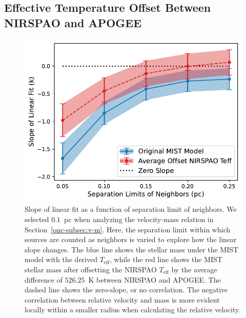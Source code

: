 \documentclass[12pt]{ucsddissertation}
\begin{document}
\begin{CJK*}{UTF8}{gbsn}
\subsection{Effective Temperature Offset Between NIRSPAO and APOGEE}
\label{onc-subsec:teff offset}
\begin{figure}[htb!]
    \centering
    \includegraphics[width=0.7\linewidth]{figures/chapter1/slope_vs_sep.pdf}
    \caption[Slope of linear fit vs. separation limit of neighbors]{Slope of linear fit as a function of separation limit of neighbors. We selected $0.1$~pc when analyzing the velocity-mass relation in Section~\ref{onc-subsec:v-m}. Here, the separation limit within which sources are counted as neighbors is varied to explore how the linear slope changes. The blue line shows the stellar mass under the MIST model with the derived $T_\mathrm{eff}$, while the red line shows the MIST stellar mass after offsetting the NIRSPAO $T_\mathrm{eff}$ by the average difference of $526.25$~K between NIRSPAO and APOGEE. The dashed line shows the zero-slope, or no correlation. The negative correlation between relative velocity and mass is more evident locally within a smaller radius when calculating the relative velocity.}
    \label{fig:slope_vs_mass}
\end{figure}


\end{CJK*}
\end{document}
